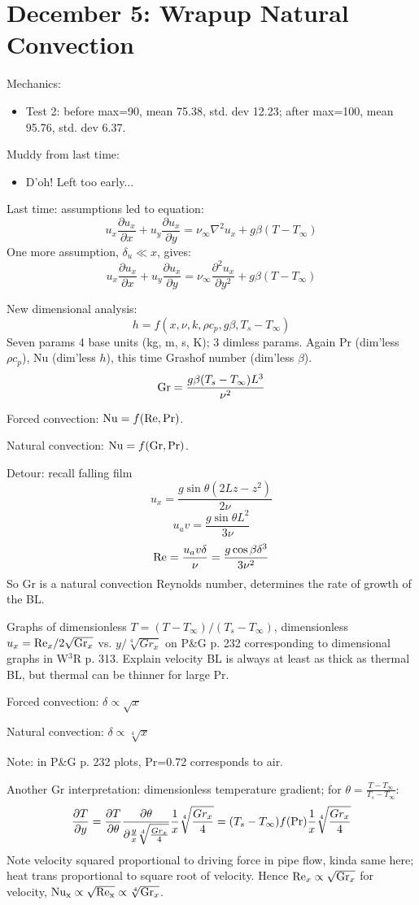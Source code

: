 \documentclass{report}
\begin{document}
\section{December 5: Wrapup Natural Convection}

Mechanics:
\begin{itemize}
  \item Test 2: before max=90, mean 75.38, std. dev 12.23; after max=100, mean
    95.76, std. dev 6.37.
\end{itemize}
Muddy from last time:
\begin{itemize}
\item D'oh!  Left too early...
\end{itemize}

Last time: assumptions led to equation:
$$u_x\frac{\partial u_x}{\partial x} + u_y\frac{\partial u_x}{\partial y} =
\nu_\infty\nabla^2 u_x + g\beta(T-T_\infty)$$
One more assumption, $\delta_u\ll x$, gives:
$$u_x\frac{\partial u_x}{\partial x} + u_y\frac{\partial u_x}{\partial y} =
\nu_\infty\frac{\partial^2u_x}{\partial y^2} + g\beta(T-T_\infty)$$

New dimensional analysis:
$$h = f(x, \nu, k, \rho c_p, g\beta, T_s-T_\infty)$$
Seven params 4 base units (kg, m, s, K); 3 dimless params.  Again Pr (dim'less
$\rho c_p$), Nu (dim'less $h$), this time Grashof number (dim'less $\beta$).
$${\rm Gr} = \frac{g\beta(T_s-T_\infty)L^3}{\nu^2}$$

Forced convection: ${\rm Nu} = f({\rm Re, Pr})$.

Natural convection: ${\rm Nu} = f({\rm Gr, Pr})$.

Detour: recall falling film
$$u_x = \frac{g\sin\theta(2Lz-z^2)}{2\nu}$$
$$u_av = \frac{g\sin\theta L^2}{3\nu}$$
$${\rm Re} = \frac{u_av \delta}{\nu} = \frac{g\cos\beta\delta^3}{3\nu^2}$$
So Gr is a natural convection Reynolds number, determines the rate of growth of
the BL.

Graphs of dimensionless $T=(T-T_\infty)/(T_s-T_\infty)$, dimensionless
$u_x={\rm Re}_x/2\sqrt{{\rm Gr}_x}$ vs. $y/\sqrt[4]{Gr_x}$ on P\&G p. 232
corresponding to dimensional graphs in W$^3$R p. 313.  Explain velocity BL is
always at least as thick as thermal BL, but thermal can be thinner for large
Pr.

Forced convection: $\delta\propto\sqrt{x}$

Natural convection: $\delta\propto\sqrt[4]{x}$

Note: in P\&G p. 232 plots, Pr=0.72 corresponds to air.

Another Gr interpretation: dimensionless temperature
gradient; for $\theta=\frac{T-T_\infty}{T_s-T_\infty}$:
$$\frac{\partial T}{\partial y} = \frac{\partial T}{\partial\theta}
\frac{\partial\theta}{\partial\frac{y}{x}\sqrt[4]{\frac{Gr_x}{4}}}
\frac{1}{x}\sqrt[4]{\frac{Gr_x}{4}} =
(T_s-T_\infty)f({\rm Pr})\frac{1}{x}\sqrt[4]{\frac{Gr_x}{4}}$$
Note velocity squared proportional to driving force in pipe flow, kinda same
here; heat trans proportional to square root of velocity.  Hence
${\rm Re}_x\propto\sqrt{{\rm Gr}_x}$ for velocity,
$\rm Nu_x\propto\sqrt{{\rm Re}_x}\propto\sqrt[4]{{\rm Gr}_x}$.
\end{document}
